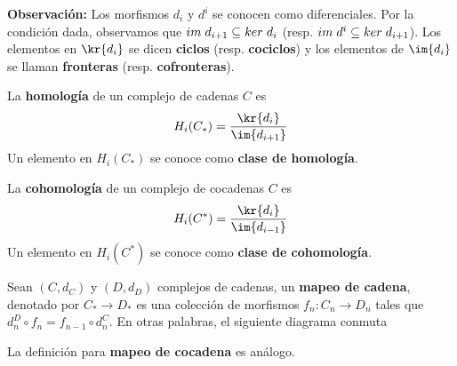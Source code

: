 \documentclass{article}
\begin{document}
\noindent\textbf{Observación:} Los morfismos $d_{i}$ y $d^{i}$ se conocen como diferenciales. Por 
la condición dada, observamos que $im\hspace{1mm}d_{i+1}\subseteq ker\hspace{1mm}d_{i}$ (resp.
$im\hspace{1mm}d^{i}\subseteq ker\hspace{1mm}d_{i+1}$). Los elementos en $\kr{d_{i}}$ se dicen
\textbf{ciclos} (resp. \textbf{cociclos}) y los elementos de $\im{d_{i}}$ se llaman 
\textbf{fronteras} (resp. \textbf{cofronteras}).

\begin{dfn}
    La \textbf{homología} de un complejo de cadenas $C$ es
    \begin{equation*}
        H_{i}(C_{*})=\frac{\kr{d_{i}}}{\im{d_{i+1}}}
    \end{equation*}
    Un elemento en $H_{i}(C_{*})$ se conoce como \textbf{clase de homología}.
\end{dfn}

\begin{dfn}
    La \textbf{cohomología} de un complejo de cocadenas $C$ es
    \begin{equation*}
        H_{i}(C^{*})=\frac{\kr{d_{i}}}{\im{d_{i-1}}}
    \end{equation*}
    Un elemento en $H_{i}(C^{*})$ se conoce como \textbf{clase de cohomología}.
\end{dfn}

\begin{dfn}
    Sean $(C,d_{C})$ y $(D,d_{D})$ complejos de cadenas, un \textbf{mapeo de cadena}, denotado por 
    $C_{*}\to D_{*}$ es una colección de morfismos $f_{n}:C_{n}\to D_{n}$ tales que $d_{n}^{D}
    \circ f_{n}=f_{n-1}\circ d_{n}^{C}$. En otras palabras, el siguiente diagrama conmuta
    
    \vspace{2mm}
    \centerline{
    }
\end{dfn}

\vspace{2mm}
\noindent La definición para \textbf{mapeo de cocadena} es análogo.
\end{document}
